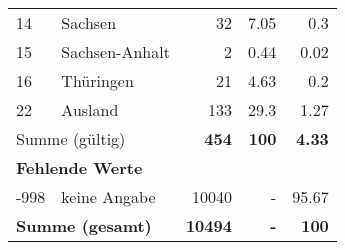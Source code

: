 \begin{longtable}{lXrrr}
     14 &
     \multicolumn{1}{X}{ Sachsen   } &


       \num{32} &
       \num[round-mode=places,round-precision=2]{7.05} &
         \num[round-mode=places,round-precision=2]{0.3} \\

     15 &
     \multicolumn{1}{X}{ Sachsen-Anhalt   } &


       \num{2} &
       \num[round-mode=places,round-precision=2]{0.44} &
         \num[round-mode=places,round-precision=2]{0.02} \\

     16 &
     \multicolumn{1}{X}{ Thüringen   } &


       \num{21} &
       \num[round-mode=places,round-precision=2]{4.63} &
         \num[round-mode=places,round-precision=2]{0.2} \\

     22 &
     \multicolumn{1}{X}{ Ausland   } &


       \num{133} &
       \num[round-mode=places,round-precision=2]{29.3} &
         \num[round-mode=places,round-precision=2]{1.27} \\
     \midrule
     \multicolumn{2}{l}{Summe (gültig)} &
       \textbf{\num{454}} &
     \textbf{\num{100}} &
       \textbf{\num[round-mode=places,round-precision=2]{4.33}} \\
     \multicolumn{5}{l}{\textbf{Fehlende Werte}}\\
       -998 &
       keine Angabe &
         \num{10040} &
        - &
         \num[round-mode=places,round-precision=2]{95.67} \\
     \midrule
     \multicolumn{2}{l}{\textbf{Summe (gesamt)}} &
          \textbf{\num{10494}} &
        \textbf{-} &
        \textbf{\num{100}} \\
     \bottomrule
     \end{longtable}
     

